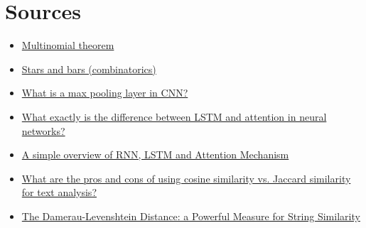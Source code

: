 \documentclass{article}
\begin{document}
\section{Sources}
\begin{itemize}
    \item \href{https://en.wikipedia.org/wiki/Multinomial_theorem}{Multinomial theorem}
    \item \href{https://en.wikipedia.org/wiki/Stars_and_bars_(combinatorics)}{Stars and bars (combinatorics)}
    \item \href{https://www.educative.io/answers/what-is-a-max-pooling-layer-in-cnn}{What is a max pooling layer in CNN?}
    \item \href{https://www.quora.com/What-exactly-is-the-difference-between-LSTM-and-attention-in-neural-networks#:~:text=In%20summary%2C%20while%20LSTM%20is,performance%20of%20neural%20network%20models.}{What exactly is the difference between LSTM and attention in neural networks?}
    \item \href{https://medium.com/swlh/a-simple-overview-of-rnn-lstm-and-attention-mechanism-9e844763d07b}{A simple overview of RNN, LSTM and Attention Mechanism}
    \item \href{https://www.linkedin.com/advice/3/what-pros-cons-using-cosine-similarity-vs}{What are the pros and cons of using cosine similarity vs. Jaccard similarity for text analysis?}
    \item \href{https://medium.com/@evertongomede/the-damerau-levenshtein-distance-a-powerful-measure-for-string-similarity-22dc4b150f0a}{The Damerau-Levenshtein Distance: a Powerful Measure for String Similarity}
\end{itemize}
\end{document}

